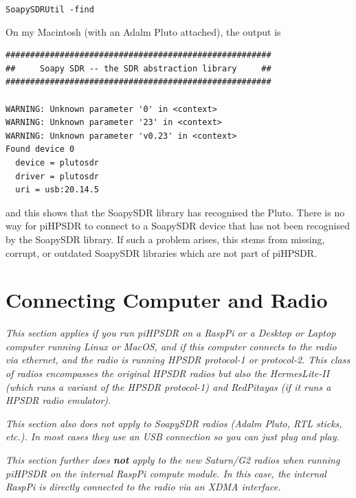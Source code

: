 \documentclass[12pt]{book}
\def\grtt#1{\texttt{\color{magenta}#1}}
\def\pH{pi\-HPSDR\xspace}
\begin{document}
\grtt{SoapySDRUtil -find}

On my Macintosh (with an Adalm Pluto attached), the output is

\begin{small}
\begin{verbatim}
######################################################
##     Soapy SDR -- the SDR abstraction library     ##
######################################################

WARNING: Unknown parameter '0' in <context>
WARNING: Unknown parameter '23' in <context>
WARNING: Unknown parameter 'v0.23' in <context>
Found device 0
  device = plutosdr
  driver = plutosdr
  uri = usb:20.14.5
\end{verbatim}
\end{small}

and this shows that the SoapySDR library has recognised the Pluto.
There is no way for \pH to connect
to a SoapySDR device that has not been recognised by the SoapySDR library. If such a problem arises, this
stems from missing, corrupt, or outdated SoapySDR libraries which are not part of \pH.
\chapter[Connecting the Computer and the Radio]{Connecting Computer and Radio}
\label{sec:dhcp}
\textit{This section applies if you run \pH on a
RaspPi or a Desktop or Laptop computer running Linux or MacOS, and if this computer connects to the
radio via ethernet, and the radio is running HPSDR protocol-1 or protocol-2. This class of radios
encompasses the original HPSDR radios but also the HermesLite-II (which runs a variant of the HPSDR
protocol-1) and RedPitayas (if it runs a HPSDR radio emulator).}

\textit{This section also does not apply to SoapySDR radios (Adalm Pluto, RTL sticks, etc.). In most
cases they use an USB connection so you can just plug and play.}

\textit{This section further does \textbf{not} apply to the new Saturn/G2 radios when running \pH on the
internal RaspPi compute module. In this case, the internal RaspPi
is directly connected to the radio via an XDMA interface.}
\end{document}
